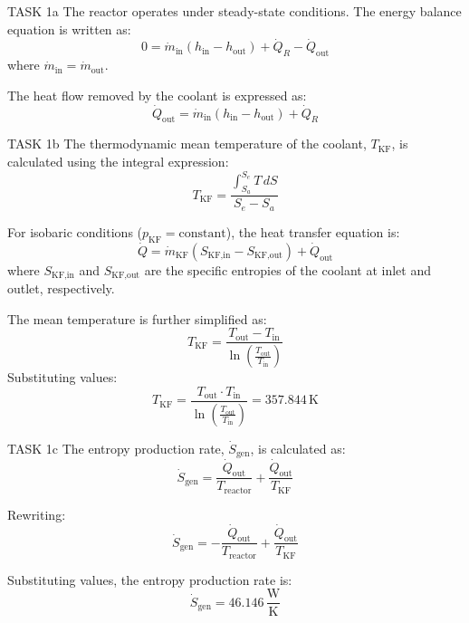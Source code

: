 TASK 1a  
The reactor operates under steady-state conditions. The energy balance equation is written as:  
\[
0 = \dot{m}_{\text{in}} (h_{\text{in}} - h_{\text{out}}) + \dot{Q}_R - \dot{Q}_{\text{out}}
\]  
where \( \dot{m}_{\text{in}} = \dot{m}_{\text{out}} \).  

The heat flow removed by the coolant is expressed as:  
\[
\dot{Q}_{\text{out}} = \dot{m}_{\text{in}} (h_{\text{in}} - h_{\text{out}}) + \dot{Q}_R
\]  

TASK 1b  
The thermodynamic mean temperature of the coolant, \( T_{\text{KF}} \), is calculated using the integral expression:  
\[
T_{\text{KF}} = \frac{\int_{S_a}^{S_e} T \, dS}{S_e - S_a}
\]  

For isobaric conditions (\( p_{\text{KF}} = \text{constant} \)), the heat transfer equation is:  
\[
\dot{Q} = \dot{m}_{\text{KF}} (S_{\text{KF,in}} - S_{\text{KF,out}}) + \dot{Q}_{\text{out}}
\]  
where \( S_{\text{KF,in}} \) and \( S_{\text{KF,out}} \) are the specific entropies of the coolant at inlet and outlet, respectively.  

The mean temperature is further simplified as:  
\[
T_{\text{KF}} = \frac{T_{\text{out}} - T_{\text{in}}}{\ln \left( \frac{T_{\text{out}}}{T_{\text{in}}} \right)}
\]  
Substituting values:  
\[
T_{\text{KF}} = \frac{T_{\text{out}} \cdot T_{\text{in}}}{\ln \left( \frac{T_{\text{out}}}{T_{\text{in}}} \right)} = 357.844 \, \text{K}
\]  

TASK 1c  
The entropy production rate, \( \dot{S}_{\text{gen}} \), is calculated as:  
\[
\dot{S}_{\text{gen}} = \frac{\dot{Q}_{\text{out}}}{T_{\text{reactor}}} + \frac{\dot{Q}_{\text{out}}}{T_{\text{KF}}}
\]  

Rewriting:  
\[
\dot{S}_{\text{gen}} = -\frac{\dot{Q}_{\text{out}}}{T_{\text{reactor}}} + \frac{\dot{Q}_{\text{out}}}{T_{\text{KF}}}
\]  

Substituting values, the entropy production rate is:  
\[
\dot{S}_{\text{gen}} = 46.146 \, \frac{\text{W}}{\text{K}}
\]